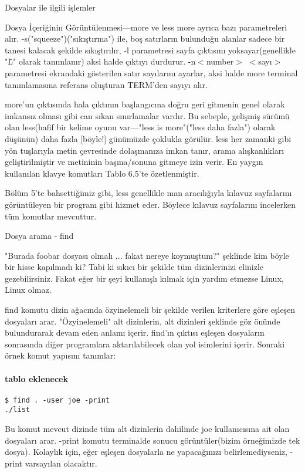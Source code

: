 \begin{section}{Dosyalar ile ilgili işlemler}
\begin{subsection}{Dosya İçeriğinin Görüntülenmesi—more ve less}
more ayrıca bazı parametreleri alır. -s("squeeze")("sıkıştırma") ile, boş satırların bulunduğu alanlar sadece bir tanesi kalacak şekilde sıkıştırılır, -l parametresi sayfa çıktısını yoksayar(genellikle "\^L" olarak tanımlanır) aksi halde çıktıyı durdurur. -n$<$number$>$ $<$sayı$>$ parametresi ekrandaki gösterilen satır sayılarını ayarlar, aksi halde more terminal tanımlamasına referans oluşturan TERM'den sayıyı alır.

more'un çıktısında hala çıktının başlangıcına doğru geri gitmenin genel olarak imkansız olması gibi can sıkan sınırlamalar vardır. Bu sebeple, gelişmiş sürümü olan less(hafif bir kelime oyunu var—"less is more"("less daha fazla") olarak düşünün) daha fazla [böyle!] günümüzde çoklukla görülür. less her zamanki gibi yön tuşlarıyla metin çevresinde dolaşmanıza imkan tanır, arama alışkanlıkları geliştirilmiştir ve metininin başına/sonuna gitmeye izin verir. En yaygın kullanılan klavye komutları Tablo 6.5'te özetlenmiştir.

Bölüm 5'te bahsettiğimiz gibi, less genellikle man aracılığıyla kılavuz sayfalarını görüntüleyen bir program gibi hizmet eder. Böylece kılavuz sayfalarını incelerken tüm komutlar mevcuttur.
\end{subsection}
\begin{subsection}{Dosya arama - find}

"Burada foobar dosyası olmalı ... fakat nereye koymuştum?" şeklinde kim böyle bir hisse kapılmadı ki? Tabi ki sıkıcı bir şekilde tüm dizinlerinizi elinizle gezebilirsiniz. Fakat eğer bir şeyi kullanışlı kılmak için yardım etmezse Linux, Linux olmaz.

find komutu dizin ağacında özyinelemeli bir şekilde verilen kriterlere göre eşleşen dosyaları arar. "Özyinelemeli" alt dizinlerin, alt dizinleri şeklinde göz önünde bulundurarak devam eden anlamı içerir. find'ın çıktısı eşleşen dosyaların sonrasında diğer programlara aktarılabilecek olan yol isimlerini içerir. Sonraki örnek komut yapısını tanımlar:

\paragraph{tablo eklenecek}{}

\begin{verbatim}
$ find . -user joe -print
./list
\end{verbatim}
Bu komut mevcut dizinde tüm alt dizinlerin dahilinde joe kullanıcısına ait olan dosyaları arar. -print komutu terminalde sonucu görüntüler(bizim örneğimizde tek dosya). Kolaylık için, eğer eşleşen dosyalarla ne yapacağınızı belirlemediyseniz, -print varsayılan olacaktır.


\end{subsection}
\end{section}
